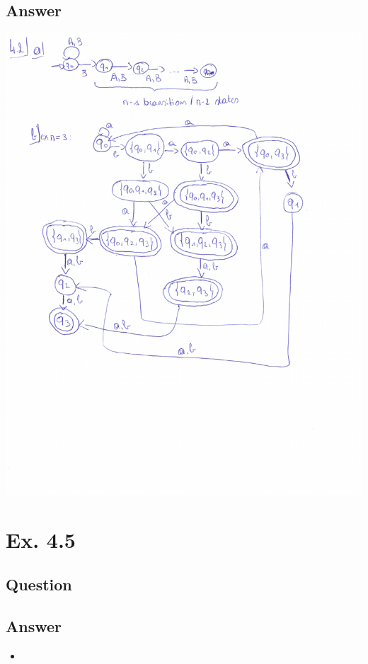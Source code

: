\documentclass[12pt]{article}
\begin{document}
\subsection*{Answer}
\begin{centering}
	\includegraphics*[scale=0.8]{ex2.pdf}
\end{centering}


\newpage
\section*{Ex. 4.5}
\subsection*{Question}

\subsection*{Answer}
\begin{itemize}
	\item 
\end{itemize}
\end{document}
